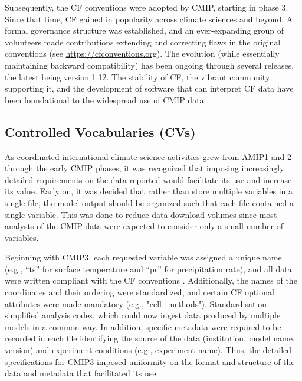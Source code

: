 \documentclass[gmd, preprint]{copernicus}
\newcommand{\mycomment}[1]{}
\begin{document}
Subsequently, the CF conventions were adopted by CMIP, starting in phase 3. Since that time, CF gained in popularity across climate sciences and beyond. A formal governance structure was established, and an ever-expanding group of volunteers made contributions extending and correcting flaws in the original conventions (see \url{https://cfconventions.org}). The evolution (while essentially maintaining backward compatibility) has been ongoing through several releases, the latest being version 1.12. The stability of CF, the vibrant community supporting it, and the development of software that can interpret CF data have been foundational to the widespread use of CMIP data. 

\mycomment{
https://www.unidata.ucar.edu/software/netcdf/conventions.html
https://www.unidata.ucar.edu/software/netcdf/coords/proposals.html
COARDS 1995 - https://web.archive.org/web/20100527095818/http://ferret.wrc.noaa.gov/noaa_coop/coop_cdf_profile.html
GDT 1997
https://www.unidata.ucar.edu/mailing_lists/archives/netcdfgroup/1997/msg00080.html
https://www.unidata.ucar.edu/software/netcdf/coords/0054.html 1997
https://web.archive.org/web/20100610102527/http://www-pcmdi.llnl.gov/drach/GDT_convention.html 1999
https://web.archive.org/web/20040604041414/http://www-pcmdi.llnl.gov/drach/netCDF.html
CF 2003 - https://cfconventions.org/Data/cf-conventions/cf-conventions-1.11/cf-conventions.html#_version_1_0_28_october_2003 
}


\subsection{Controlled Vocabularies (CVs)}
\label{sec:CMIPCVs}
\mycomment{Attn: IPSL folks; MIP era realm evolution, dovetailing Variable request section}

As coordinated international climate science activities grew from AMIP1 and 2 through the early CMIP phases, it was recognized that imposing increasingly detailed requirements on the data reported would facilitate its use and increase its value. Early on, it was decided that rather than store multiple variables in a single file, the model output should be organized such that each file contained a single variable. This was done to reduce data download volumes since most analysts of the CMIP data were expected to consider only a small number of variables.

Beginning with CMIP3, each requested variable was assigned a unique name (e.g., “ts” for surface temperature and “pr” for precipitation rate), and all data were written compliant with the CF conventions \citep[e.g.,][]{taylor_pcmdi_2009}. Additionally, the names of the coordinates and their ordering were standardized, and certain CF optional attributes were made mandatory (e.g., "cell\_methods"). Standardisation simplified analysis codes, which could now ingest data produced by multiple models in a common way. In addition, specific metadata were required to be recorded in each file identifying the source of the data (institution, model name, version) and experiment conditions (e.g., experiment name). Thus, the detailed specifications for CMIP3 \citep[see][]{taylor_pcmdi_2005} imposed uniformity on the format and structure of the data and metadata that facilitated its use.
\end{document}

